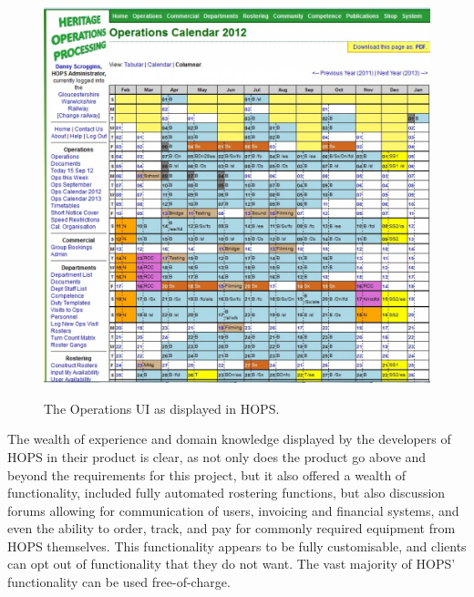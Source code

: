 \begin{figure}[!ht]
    \includegraphics[width=\textwidth]{Figures/hops-operations}
    \caption{The Operations UI as displayed in HOPS.}
    \label{fig:hops} \cite{Hops3}
\end{figure}

The wealth of experience and domain knowledge displayed by the developers of HOPS in their product is clear, as not only does the product go above and beyond the requirements for this project, but it also offered a wealth of functionality, included fully automated rostering functions, but also discussion forums allowing for communication of users, invoicing and financial systems, and even the ability to order, track, and pay for commonly required equipment from HOPS themselves. This functionality appears to be fully customisable, and clients can opt out of functionality that they do not want. The vast majority of HOPS' functionality can be used free-of-charge. \cite{Hops1} \cite{Hops2}

